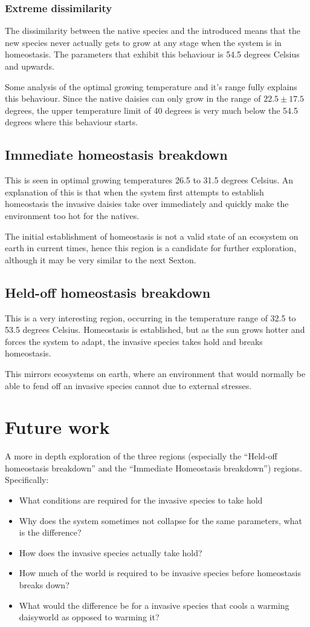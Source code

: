 \documentclass[12pt]{article}
\begin{document}
\subsubsection{Extreme dissimilarity}
The dissimilarity between the native species and the introduced means
that the new species never actually gets to grow at any stage when the
system is in homeostasis. The parameters that exhibit this behaviour
is 54.5 degrees Celsius and upwards.

Some analysis of the optimal growing temperature and it's range fully
explains this behaviour. Since the native daisies can only grow in the
range of $22.5 \pm 17.5$ degrees, the upper temperature limit of 40
degrees is very much below the 54.5 degrees where this behaviour starts.
\subsection{Immediate homeostasis breakdown}
This is seen in optimal growing temperatures 26.5 to 31.5 degrees
Celsius. An explanation of this is that when the system first attempts
to establish homeostasis the invasive daisies take over immediately
and quickly make the environment too hot for the natives.

The initial establishment of homeostasis is not a valid state of an
ecosystem on earth in current times, hence this region is a candidate
for further exploration, although it may be very similar to the next Sexton.

\subsection{Held-off homeostasis breakdown}
This is a very interesting region, occurring in the temperature range
of 32.5 to 53.5 degrees Celsius. Homeostasis is established, but as
the sun grows hotter and forces the system to adapt, the invasive
species takes hold and breaks homeostasis.

This mirrors ecosystems on earth, where an environment that would
normally be able to fend off an invasive species cannot due to
external stresses\cite{albert2000}.

\section{Future work}
A more in depth exploration of the three regions (especially the
``Held-off homeostasis breakdown'' and the ``Immediate Homeostasis
breakdown'') regions. Specifically:
\begin{itemize}
\item What conditions are required for the invasive species to take hold
\item Why does the system sometimes not collapse for the same
  parameters, what is the difference?
\item How does the invasive species actually take hold?
\item How much of the world is required to be invasive species before
  homeostasis breaks down?
\item What would the difference be for a invasive species that cools a
  warming daisyworld as opposed to warming it?
\end{itemize}
\end{document}
